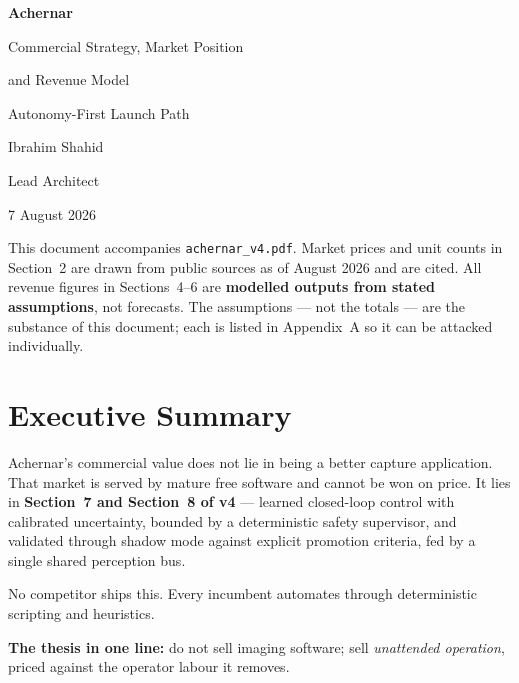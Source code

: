 \documentclass[11pt]{article}
\begin{document}
\begin{titlepage}
\centering
\vspace*{2.5cm}
{\Huge\bfseries\color{acnavy} Achernar\par}
\vspace{0.6cm}
{\LARGE\color{acblue} Commercial Strategy, Market Position\par}
{\LARGE\color{acblue} and Revenue Model\par}
\vspace{1.2cm}
{\large\color{acgray} Autonomy-First Launch Path\par}
\vspace{2.5cm}
{\large Ibrahim Shahid\par}
{\normalsize\color{acgray} Lead Architect\par}
\vspace{1.5cm}
{\normalsize\color{acgray} 7 August 2026\par}
\vfill
\begin{keybox}
\small
This document accompanies \texttt{achernar\_v4.pdf}. Market prices and unit
counts in Section~2 are drawn from public sources as of August 2026 and are
cited. All revenue figures in Sections~4--6 are \textbf{modelled outputs from
stated assumptions}, not forecasts. The assumptions --- not the totals --- are
the substance of this document; each is listed in Appendix~A so it can be
attacked individually.
\end{keybox}
\end{titlepage}

\tableofcontents
\newpage

\section{Executive Summary}

Achernar's commercial value does not lie in being a better capture application.
That market is served by mature free software and cannot be won on price. It
lies in \textbf{Section~7 and Section~8 of v4} --- learned closed-loop control
with calibrated uncertainty, bounded by a deterministic safety supervisor, and
validated through shadow mode against explicit promotion criteria, fed by a
single shared perception bus.

No competitor ships this. Every incumbent automates through deterministic
scripting and heuristics.

\begin{keybox}
\textbf{The thesis in one line:} do not sell imaging software; sell
\emph{unattended operation}, priced against the operator labour it removes.
\end{keybox}
\end{document}
